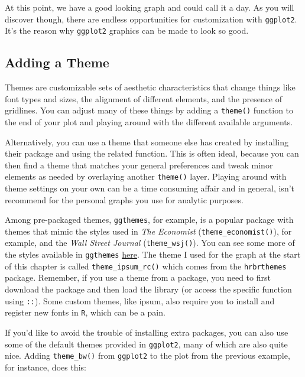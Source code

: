 \documentclass[
  letterpaper,
]{book}
\begin{document}
At this point, we have a good looking graph and could call it a day. As
you will discover though, there are endless opportunities for
customization with \texttt{ggplot2}. It's the reason why
\texttt{ggplot2} graphics can be made to look so good.

\hypertarget{adding-a-theme}{%
\subsection{Adding a Theme}\label{adding-a-theme}}

Themes are customizable sets of aesthetic characteristics that change
things like font types and sizes, the alignment of different elements,
and the presence of gridlines. You can adjust many of these things by
adding a \texttt{theme()} function to the end of your plot and playing
around with the different available arguments.

Alternatively, you can use a theme that someone else has created by
installing their package and using the related function. This is often
ideal, because you can then find a theme that matches your general
preferences and tweak minor elements as needed by overlaying another
\texttt{theme()} layer. Playing around with theme settings on your own
can be a time consuming affair and in general, isn't recommend for the
personal graphs you use for analytic purposes.

Among pre-packaged themes, \texttt{ggthemes}, for example, is a popular
package with themes that mimic the styles used in \emph{The Economist}
(\texttt{theme\_economist()}), for example, and the \emph{Wall Street
Journal} (\texttt{theme\_wsj()}). You can see some more of the styles
available in \texttt{ggthemes}
\href{https://yutannihilation.github.io/allYourFigureAreBelongToUs/ggthemes/}{here}.
The theme I used for the graph at the start of this chapter is called
\texttt{theme\_ipsum\_rc()} which comes from the \texttt{hrbrthemes}
package. Remember, if you use a theme from a package, you need to first
download the package and then load the library (or access the specific
function using \texttt{::}). Some custom themes, like ipsum, also
require you to install and register new fonts in \texttt{R}, which can
be a pain.

If you'd like to avoid the trouble of installing extra packages, you can
also use some of the default themes provided in \texttt{ggplot2}, many
of which are also quite nice. Adding \texttt{theme\_bw()} from
\texttt{ggplot2} to the plot from the previous example, for instance,
does this:
\end{document}
